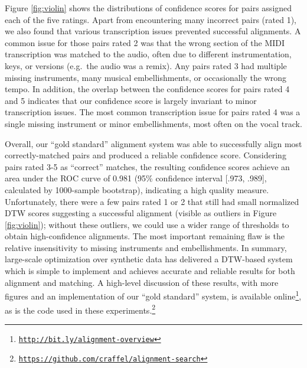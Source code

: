 \documentclass{article}
\begin{document}
Figure \ref{fig:violin} shows the distributions of confidence scores for pairs assigned each of the five ratings.
Apart from encountering many incorrect pairs (rated 1), we also found that various transcription issues prevented successful alignments.
A common issue for those pairs rated 2 was that the wrong section of the MIDI transcription was  matched to the audio, often due to different instrumentation, keys, or versions (e.g.\ the audio was a remix).
Any pairs rated 3 had multiple missing instruments, many musical embellishments, or occasionally the wrong tempo.
In addition, the overlap between the confidence scores for pairs rated 4 and 5 indicates that our confidence score is largely invariant to minor transcription issues.
The most common transcription issue for pairs rated 4 was a single missing instrument or minor embellishments, most often on the vocal track.

Overall, our ``gold standard'' alignment system was able to successfully align most correctly-matched pairs and produced a reliable confidence score.
Considering pairs rated 3-5 as ``correct'' matches, the resulting confidence scores achieve an area under the ROC curve of 0.981 (95\% confidence interval [.973, .989], calculated by 1000-sample bootstrap), indicating a high quality measure.
Unfortunately, there were a few pairs rated 1 or 2 that still had small normalized DTW scores suggesting a successful alignment (visible as outliers in Figure \ref{fig:violin}); without these outliers, we could use a wider range of thresholds to obtain high-confidence alignments.
The most important remaining flaw is the relative insensitivity to missing instruments and embellishments.
In summary, large-scale optimization over synthetic data has delivered a DTW-based system which is simple to implement and achieves accurate and reliable results for both alignment and matching.
A high-level discussion of these results, with more figures and an implementation of our ``gold standard'' system, is available online\footnote{\href{http://bit.ly/alignment-overview}{\texttt{http://bit.ly/alignment-overview}}}, as is the code used in these experiments.\footnote{\href{https://github.com/craffel/alignment-search}{\texttt{https://github.com/craffel/alignment-search}}} 



\end{document}

